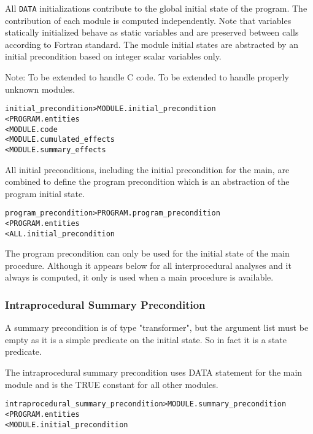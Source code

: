 \documentclass[a4paper]{report}
\newenvironment{PipsMake}{\begin{alltt}}{\end{alltt}}
\newenvironment{PipsPass}[1]{\label{pass:#1}}{}
\begin{document}
All \texttt{DATA} initializations contribute to the global initial state
of the program. The contribution of each module is computed independently.
Note that variables statically initialized behave as static variables and
are preserved between calls according to Fortran standard. The module
initial states are abstracted by an initial precondition based on integer
scalar variables only.

Note: To be extended to handle C code. To be extended to handle properly
unknown modules.

\begin{PipsMake}
initial_precondition     > MODULE.initial_precondition
        < PROGRAM.entities
        < MODULE.code
        < MODULE.cumulated_effects
        < MODULE.summary_effects
\end{PipsMake}

All initial preconditions, including the initial precondition for the
main, are combined to define the program precondition which is an
abstraction of the program initial state.

\begin{PipsMake}
program_precondition     > PROGRAM.program_precondition
        < PROGRAM.entities
        < ALL.initial_precondition
\end{PipsMake}

The program precondition can only be used for the initial state of the
main procedure. Although it appears below for all interprocedural analyses
and it always is computed, it only is used when a main procedure is
available.

\subsubsection{Intraprocedural Summary Precondition}

\begin{PipsPass}{intraprocedural_summary_precondition}
A summary precondition is of type "transformer", but the argument list
must be empty as it is a simple predicate on the initial state. So in fact
it is a state predicate.
\end{PipsPass}

The intraprocedural summary precondition uses DATA statement for the main
module and is the TRUE constant for all other modules.

\begin{PipsMake}
intraprocedural_summary_precondition            > MODULE.summary_precondition
        < PROGRAM.entities
        < MODULE.initial_precondition
\end{PipsMake}
\end{document}
